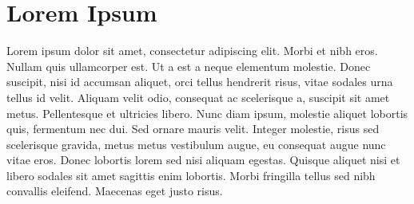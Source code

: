 \documentclass[11pt]{article}
\begin{document}
\section{Lorem Ipsum}


Lorem ipsum dolor sit amet, consectetur adipiscing elit. Morbi et nibh eros. Nullam quis ullamcorper est. Ut a est a neque elementum molestie. Donec suscipit, nisi id accumsan aliquet, orci tellus hendrerit risus, vitae sodales urna tellus id velit. Aliquam velit odio, consequat ac scelerisque a, suscipit sit amet metus. Pellentesque et ultricies libero. Nunc diam ipsum, molestie aliquet lobortis quis, fermentum nec dui. Sed ornare mauris velit. Integer molestie, risus sed scelerisque gravida, metus metus vestibulum augue, eu consequat augue nunc vitae eros. Donec lobortis lorem sed nisi aliquam egestas. Quisque aliquet nisi et libero sodales sit amet sagittis enim lobortis. Morbi fringilla tellus sed nibh convallis eleifend. Maecenas eget justo risus. 
\end{document}
